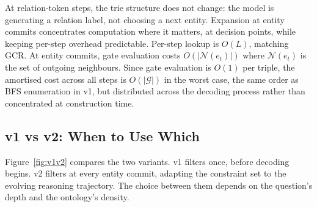 At relation-token steps, the trie structure does not change: the model is generating a
relation label, not choosing a next entity. Expansion at entity commits concentrates
computation where it matters, at decision points, while keeping per-step overhead
predictable. Per-step lookup is $O(L)$, matching GCR. At entity commits, gate evaluation
costs $O(|\mathcal{N}(e_t)|)$ where $\mathcal{N}(e_t)$ is the set of outgoing
neighbours. Since gate evaluation is $O(1)$ per triple, the amortised cost across all
steps is $O(|\mathcal{G}|)$ in the worst case, the same order as BFS enumeration in v1,
but distributed across the decoding process rather than concentrated at construction
time.

\subsection{v1 vs v2: When to Use Which}
\label{sec:method:comparison}

Figure~\ref{fig:v1v2} compares the two variants. v1 filters once, before decoding
begins. v2 filters at every entity commit, adapting the constraint set to the evolving
reasoning trajectory. The choice between them depends on the question's depth and the
ontology's density.

